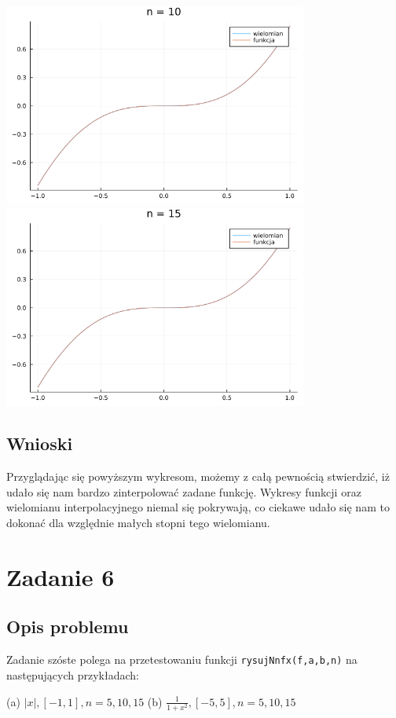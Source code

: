 \documentclass{article}
\begin{document}
\begin{center}
    \includegraphics[width=100mm]{z5f2_10.png}
    \includegraphics[width=100mm]{z5f2_15.png}
    \subsection{Wnioski}
    \large Przyglądając się powyższym wykresom, możemy z całą pewnością stwierdzić, iż udało się nam bardzo zinterpolować zadane funkcję.
     Wykresy funkcji oraz wielomianu interpolacyjnego niemal się pokrywają, co ciekawe udało się nam to dokonać dla względnie małych stopni tego wielomianu.
     
    \section{Zadanie 6}
    \subsection{Opis problemu}
    \large Zadanie szóste polega na przetestowaniu funkcji \texttt{rysujNnfx(f,a,b,n)} na następujących przykładach: \newline
    \begin{flushleft}
        (a) \(|x|, [-1,1], n = 5,10,15\) \newline
        (b) \(\frac{1}{1+x^2}, [-5, 5], n=5,10,15\) \newline
    \end{flushleft}

\end{center}
\end{document}
